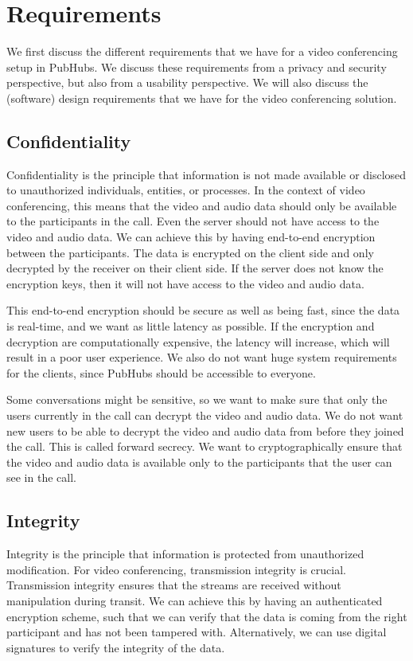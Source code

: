 \documentclass{report}
\begin{document}
\chapter{Requirements}\label{chap:requirements}
We first discuss the different requirements that we have for a video conferencing setup in PubHubs. We discuss
these requirements from a privacy and security perspective, but also from a usability perspective. We will also
discuss the (software) design requirements that we have for the video conferencing solution.

\section{Confidentiality}
Confidentiality is the principle that information is not made available or disclosed to unauthorized individuals,
entities, or processes. In the context of video conferencing, this means that the video and audio data should only
be available to the participants in the call. Even the server should not have access to the video and audio data. We
can achieve this by having end-to-end encryption between the participants. The data is encrypted on the client side and
only decrypted by the receiver on their client side. If the server does not know the encryption keys, then it will
not have access to the video and audio data.

This end-to-end encryption should be secure as well as being fast, since the data is real-time, and we want as little
latency as possible. If the encryption and decryption are computationally expensive, the latency will increase,
which will result in a poor user experience. We also do not want huge system requirements for the clients, since
PubHubs should be accessible to everyone.

Some conversations might be sensitive, so we want to make sure that only the users currently in the call can
decrypt the video and audio data. We do not want new users to be able to decrypt the video and audio data from
before they joined the call. This is called forward secrecy. We want to cryptographically ensure that
the video and audio data is available only to the participants that the user can see in the call.

\section{Integrity}
Integrity is the principle that information is protected from unauthorized modification. For video conferencing, transmission integrity
is crucial. Transmission integrity ensures that the streams are received without manipulation during transit.
We can achieve this by having an authenticated encryption scheme, such that we can verify that the data is coming from
the right participant and has not been tampered with. Alternatively, we can use digital signatures to verify the
integrity of the data.
\end{document}

